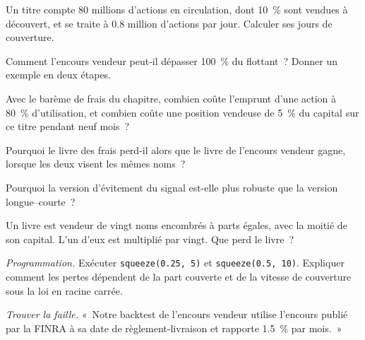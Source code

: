 \begin{exercise}[$\star$]\label{exo:s1:short-interest-borrow-and-crowding:1}
Un titre compte 80 millions d'actions en circulation, dont 10~\% sont vendues à découvert, et se traite à 0.8 million d'actions par jour. Calculer ses jours de couverture.
\end{exercise}

\begin{exercise}[$\star$]\label{exo:s1:short-interest-borrow-and-crowding:2}
Comment l'encours vendeur peut-il dépasser 100~\% du flottant~? Donner un exemple en deux étapes.
\end{exercise}

\begin{exercise}[$\star$]\label{exo:s1:short-interest-borrow-and-crowding:3}
Avec le barème de frais du chapitre, combien coûte l'emprunt d'une action à 80~\% d'utilisation, et combien coûte une position vendeuse de 5~\% du capital sur ce titre
pendant neuf mois~?
\end{exercise}

\begin{exercise}[$\star\star$]\label{exo:s1:short-interest-borrow-and-crowding:4}
Pourquoi le livre des frais perd-il alors que le livre de l'encours vendeur gagne, lorsque les deux visent les mêmes noms~?
\end{exercise}

\begin{exercise}[$\star\star$]\label{exo:s1:short-interest-borrow-and-crowding:5}
Pourquoi la version d'évitement du signal est-elle plus robuste que la version longue--courte~?
\end{exercise}

\begin{exercise}[$\star\star$]\label{exo:s1:short-interest-borrow-and-crowding:6}
Un livre est vendeur de vingt noms encombrés à parts égales, avec la moitié de son capital. L'un d'eux est multiplié par vingt. Que perd le livre~?
\end{exercise}

\begin{exercise}[$\star\star\star$]\label{exo:s1:short-interest-borrow-and-crowding:7}
\emph{Programmation.} Exécuter \texttt{squeeze(0.25, 5)} et \texttt{squeeze(0.5, 10)}. Expliquer comment les pertes dépendent de la part couverte et de la vitesse de
couverture sous la loi en racine carrée.
\end{exercise}

\begin{exercise}[$\star\star\star$]\label{exo:s1:short-interest-borrow-and-crowding:8}
\emph{Trouver la faille.} «~Notre backtest de l'encours vendeur utilise l'encours publié par la FINRA à sa date de règlement-livraison et rapporte 1.5~\% par mois.~»
\end{exercise}

